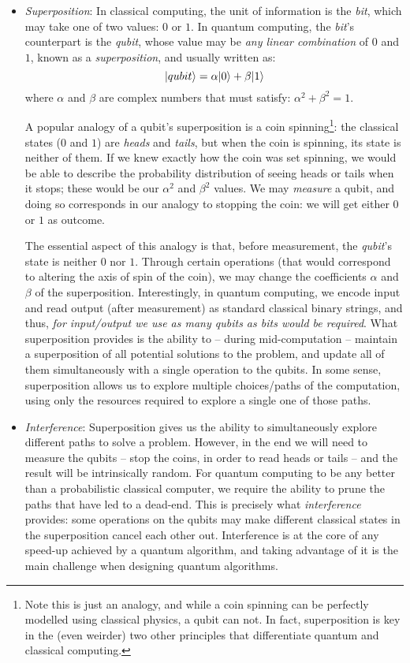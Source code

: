 \begin{itemize}

  \item \textit{Superposition}: In classical computing, the unit of information is the \textit{bit}, which may take one of two values: \(0\) or \(1\). In quantum computing, the \textit{bit}'s counterpart is the \textit{qubit}, whose value may be \textit{any linear combination} of \(0\) and \(1\), known as a \textit{superposition}, and usually written as: \[\vert qubit \rangle = \alpha\vert 0 \rangle + \beta\vert 1 \rangle\] where \(\alpha\) and \(\beta\) are complex numbers that must satisfy: \(\alpha^2 + \beta^2 = 1\).

  A popular analogy of a qubit's superposition is a coin spinning\footnote{Note this is just an analogy, and while a coin spinning can be perfectly modelled using classical physics, a qubit can not. In fact, superposition is key in the (even weirder) two other principles that differentiate quantum and classical computing.
  }: the classical states (\(0\) and \(1\)) are \textit{heads} and \textit{tails}, but when the coin is spinning, its state is neither of them. If we knew exactly how the coin was set spinning, we would be able to describe the probability distribution of seeing heads or tails when it stops; these would be our \(\alpha^2\) and \(\beta^2\) values. We may \textit{measure} a qubit, and doing so corresponds in our analogy to stopping the coin: we will get either \(0\) or \(1\) as outcome.

  The essential aspect of this analogy is that, before measurement, the \textit{qubit}'s state is neither \(0\) nor \(1\). Through certain operations (that would correspond to altering the axis of spin of the coin), we may change the coefficients \(\alpha\) and \(\beta\) of the superposition. Interestingly, in quantum computing, we encode input and read output (after measurement) as standard classical binary strings, and thus, \textit{for input/output we use as many qubits as bits would be required}. What superposition provides is the ability to -- during mid-computation -- maintain a superposition of all potential solutions to the problem, and update all of them simultaneously with a single operation to the qubits. In some sense, superposition allows us to explore multiple choices/paths of the computation, using only the resources required to explore a single one of those paths.

  \item \textit{Interference}: Superposition gives us the ability to simultaneously explore different paths to solve a problem. However, in the end we will need to measure the qubits -- stop the coins, in order to read heads or tails -- and the result will be intrinsically random. For quantum computing to be any better than a probabilistic classical computer, we require the ability to prune the paths that have led to a dead-end. This is precisely what \textit{interference} provides: some operations on the qubits may make different classical states in the superposition cancel each other out. Interference is at the core of any speed-up achieved by a quantum algorithm, and taking advantage of it is the main challenge when designing quantum algorithms.


\end{itemize}
